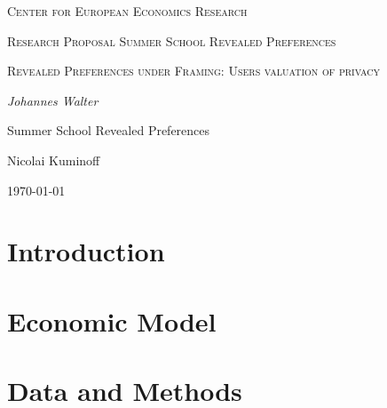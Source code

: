 \documentclass[12pt,a4paper]{article}
\author{Johannes Walter}
\begin{document}
\begin{titlepage}
    \centering
    \vspace{5cm}
    {\scshape Center for European Economics Research \par}
    \vspace{0.5cm}
    {\scshape Research Proposal Summer School Revealed Preferences \par}
    \vspace{1.5cm}
    {\scshape\LARGE Revealed Preferences under Framing: Users valuation of privacy \par}
    \vspace{2cm}
    {\itshape Johannes Walter \par}
    \vspace{1cm}
    \begin{abstract}
    Diese Dokumentation enth"alt eine sortierte Liste der wichtigsten
    \LaTeX--Befehle. Die einzelnen Listeneintr"age sind untereinander
    durch viele Querverweise verkettet, die ein Auffinden inhaltlich
    zusammengeh"origer Informationen erheblich erleichtern.
    \end{abstract}
    \vfill
    Summer School Revealed Preferences \par 
    Nicolai Kuminoff 
    \vfill

    {\large \today\par}
\end{titlepage}


\section{Introduction}
\label{introduction}


\section{Economic Model}
\label{model}


\section{Data and Methods}
\label{data and methods}


\printbibliography
\end{document}
